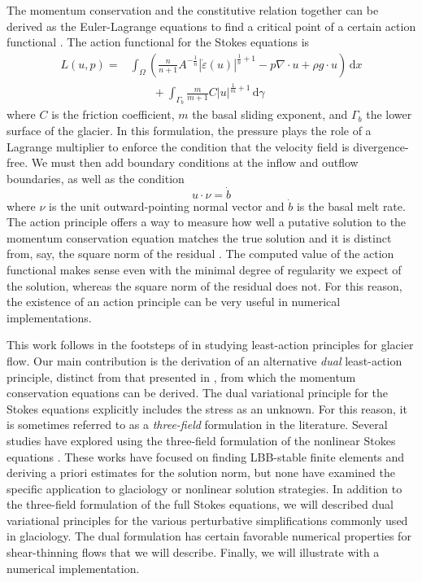 \documentclass{article}
\theoremstyle{definition}
\theoremstyle{plain}
\newcommand{\ud}{\hspace{2pt}\mathrm{d}}
\begin{document}
The momentum conservation and the constitutive relation together can be derived as the Euler-Lagrange equations to find a critical point of a certain action functional \citep{dukowicz2010consistent}.
The action functional for the Stokes equations is
\begin{align}
    L(u, p) = & \int_\Omega\left(\frac{n}{n + 1}A^{-\frac{1}{n}}|\dot\varepsilon(u)|^{\frac{1}{n} + 1} - p\nabla\cdot u + \rho g\cdot u\right)\ud x \\
    & \qquad + \int_{\Gamma_b}\frac{m}{m + 1}C|u|^{\frac{1}{m} + 1}\ud\gamma
\end{align}
where $C$ is the friction coefficient, $m$ the basal sliding exponent, and $\Gamma_b$ the lower surface of the glacier.
In this formulation, the pressure plays the role of a Lagrange multiplier to enforce the condition that the velocity field is divergence-free.
We must then add boundary conditions at the inflow and outflow boundaries, as well as the condition
\begin{equation}
    u\cdot\nu = \dot b
    \label{eq:basal-dirichlet-bc}
\end{equation}
where $\nu$ is the unit outward-pointing normal vector and $\dot b$ is the basal melt rate.
The action principle offers a way to measure how well a putative solution to the momentum conservation equation matches the true solution and it is distinct from, say, the square norm of the residual \citep{shapero2021icepack}.
The computed value of the action functional makes sense even with the minimal degree of regularity we expect of the solution, whereas the square norm of the residual does not.
For this reason, the existence of an action principle can be very useful in numerical implementations.

This work follows in the footsteps of \citet{dukowicz2010consistent} in studying least-action principles for glacier flow.
Our main contribution is the derivation of an alternative \emph{dual} least-action principle, distinct from that presented in \citet{dukowicz2010consistent}, from which the momentum conservation equations can be derived.
The dual variational principle for the Stokes equations explicitly includes the stress as an unknown.
For this reason, it is sometimes referred to as a \emph{three-field} formulation in the literature.
Several studies have explored using the three-field formulation of the nonlinear Stokes equations \citep{manouzi2001mixed, ervin2008dual, codina2009finite, farhloul2017dual}.
These works have focused on finding LBB-stable finite elements and deriving a priori estimates for the solution norm, but none have examined the specific application to glaciology or nonlinear solution strategies.
In addition to the three-field formulation of the full Stokes equations, we will described dual variational principles for the various perturbative simplifications commonly used in glaciology.
The dual formulation has certain favorable numerical properties for shear-thinning flows that we will describe.
Finally, we will illustrate with a numerical implementation.
\end{document}
